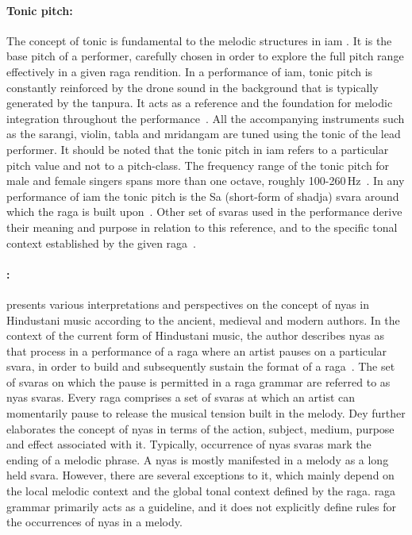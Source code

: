 \paragraph{Tonic pitch:} The concept of tonic is fundamental to the melodic structures in \gls{iam} \citep{Viswanathan2004,Danielou2010}. It is the base pitch of a performer, carefully chosen in order to explore the full pitch range effectively in a given \gls{raga} rendition. In a performance of \gls{iam}, tonic pitch is constantly reinforced by the drone sound in the background that is typically generated by the \gls{tanpura}. It acts as a reference and the foundation for melodic integration throughout the performance~\citep{Deva1980}. All the accompanying instruments such as the \gls{sarangi}, violin, \gls{tabla} and \gls{mridangam} are tuned using the tonic of the lead performer. It should be noted that the tonic pitch in \gls{iam} refers to a particular pitch value and not to a pitch-class. The frequency range of the tonic pitch for male and female singers spans more than one octave, roughly 100-260\,Hz~\citep{Sengupta2005b}. In any performance of \gls{iam} the tonic pitch is the Sa (short-form of \gls{shadja}) \gls{svara} around which the \gls{raga} is built upon~\citep{Danielou2010,Bagchee1998}. Other set of \glspl{svara} used in the performance derive their meaning and purpose in relation to this reference, and to the specific tonal context established by the given \gls{raga}~\citep{Deva1980}. 

\paragraph{:} \cite{Dey2008} presents various interpretations and perspectives on the concept of \gls{nyas} in Hindustani music according to the ancient, medieval and modern authors. In the context of the current form of Hindustani music, the author describes \gls{nyas} as that process in a performance of a \gls{raga} where an artist pauses on a particular \gls{svara}, in order to build and subsequently sustain the format of a \gls{raga}~\citep[p. 70]{Dey2008}. The set of \glspl{svara} on which the pause is permitted in a \gls{raga} grammar are referred to as \gls{nyas} \glspl{svara}. Every \gls{raga} comprises a set of \glspl{svara} at which an artist can momentarily pause to release the musical tension built in the melody. Dey further elaborates the concept of \gls{nyas} in terms of the action, subject, medium, purpose and effect associated with it. Typically, occurrence of \gls{nyas} \glspl{svara} mark the ending of a melodic phrase. A \gls{nyas} is mostly manifested in a melody as a long held \gls{svara}. However, there are several exceptions to it, which mainly depend on the local melodic context and the global tonal context defined by the \gls{raga}. \Gls{raga} grammar primarily acts as a guideline, and it does not explicitly define rules for the occurrences of \gls{nyas} in a melody. 


